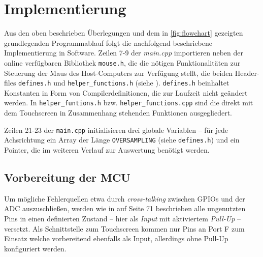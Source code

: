 \chapter{Implementierung}
	Aus den oben beschrieben Überlegungen und dem in \cref{fig:flowchart} gezeigten grundlegenden Programmablauf folgt die nachfolgend beschriebene Implementierung in Software.
	Zeilen 7-9 der \textit{main.cpp} importieren neben der online verfügbaren Bibliothek \texttt{mouse.h}, die die nötigen Funktionalitäten zur Steuerung der Maus des Host-Computers zur Verfügung stellt, die beiden Header-files \texttt{defines.h} und \texttt{helper\_functions.h} (siehe ).
	\texttt{defines.h} beinhaltet Konstanten in Form von Compilerdefinitionen, die zur Laufzeit nicht geändert werden.
	In \texttt{helper\text\_funtions.h} bzw. \texttt{helper\text\_functions.cpp} sind die direkt mit dem Touchscreen in Zusammenhang stehenden Funktionen ausgegliedert.\par\medskip

	Zeilen 21-23 der \texttt{main.cpp} initialisieren drei globale Variablen -- für jede Achsrichtung ein Array der Länge \texttt{OVERSAMPLING} (siehe \texttt{defines.h}) und ein Pointer, die im weiteren Verlauf zur Auswertung benötigt werden.

	\section{Vorbereitung der MCU}
		Um mögliche Fehlerquellen etwa durch \textit{cross-talking} zwischen GPIOs und der ADC auszuschließen, werden wie in \cite{MicrochipTechnologyInc.ATmega32U4.Datasheet.2016} auf Seite 71 beschrieben alle ungenutzten Pins in einen definierten Zustand -- hier als \textit{Input} mit aktiviertem \textit{Pull-Up} -- versetzt.
		Als Schnittstelle zum Touchscreen kommen nur Pins an Port F zum Einsatz welche vorbereitend ebenfalls als Input, allerdings ohne Pull-Up konfiguriert werden.\par\medskip

